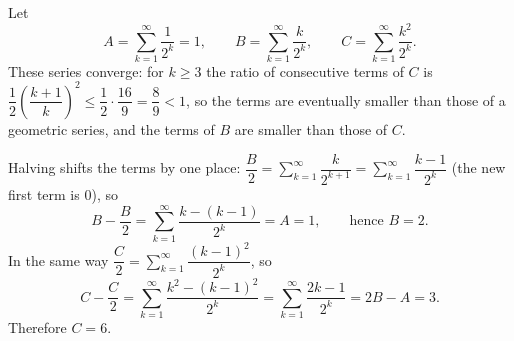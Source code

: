 Let
\[A=\sum_{k=1}^{\infty}\dfrac1{2^k}=1,\qquad B=\sum_{k=1}^{\infty}\dfrac{k}{2^k},\qquad C=\sum_{k=1}^{\infty}\dfrac{k^2}{2^k}.\]
These series converge: for $k\ge3$ the ratio of consecutive terms of $C$ is $\dfrac12\left(\dfrac{k+1}{k}\right)^2\le\dfrac12\cdot\dfrac{16}{9}=\dfrac89<1$, so the terms are eventually smaller than those of a geometric series, and the terms of $B$ are smaller than those of $C$.

Halving shifts the terms by one place: $\dfrac B2=\displaystyle\sum_{k=1}^{\infty}\dfrac{k}{2^{k+1}}=\sum_{k=1}^{\infty}\dfrac{k-1}{2^{k}}$ (the new first term is $0$), so
\[B-\dfrac B2=\sum_{k=1}^{\infty}\dfrac{k-(k-1)}{2^k}=A=1,\qquad\text{hence }B=2.\]
In the same way $\dfrac C2=\displaystyle\sum_{k=1}^{\infty}\dfrac{(k-1)^2}{2^k}$, so
\[C-\dfrac C2=\sum_{k=1}^{\infty}\dfrac{k^2-(k-1)^2}{2^k}=\sum_{k=1}^{\infty}\dfrac{2k-1}{2^k}=2B-A=3.\]
Therefore $C=\boxed{6}$.
